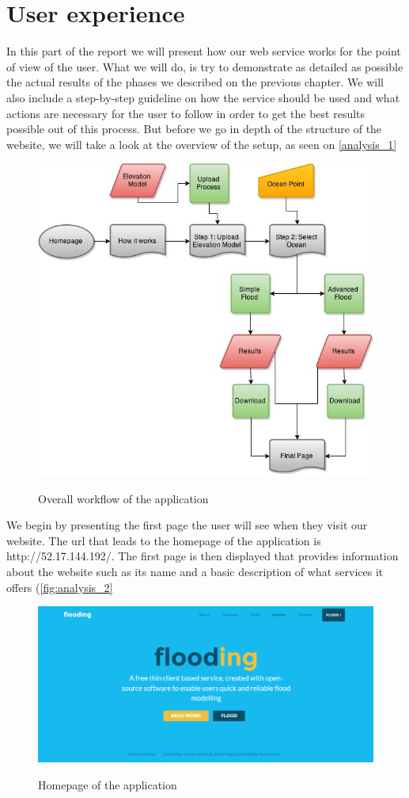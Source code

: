 \section{User experience}
In this part of the report we will present  how our web service works for the point of view of the user. What we will do, is try to demonstrate as detailed as possible the actual results of the phases we described on the previous chapter. We will also include a step-by-step guideline on how the service should be used and what actions are necessary for the user to follow in order to get the best results possible out of this process. But before we go in depth of the structure of the website, we will take a look at the overview of the setup, as seen on \autoref{analysis_1}

\begin{figure}[h!]
\centering
	{\includegraphics[width=0.75\linewidth]{gfx/Analysis_Website/1.jpg}}
\caption{Overall workflow of the application}
\label{fig:analysis_1}
\end{figure}

We begin by presenting the first page the user will see when they visit our website. The url that leads to the homepage of the application is http://52.17.144.192/. The first page is then displayed that provides information about the website such as its name and a basic description of what services it offers (\autoref{fig:analysis_2}

\begin{figure}[h!]
\centering
	{\includegraphics[width=0.75\linewidth]{gfx/Analysis_Website/2.png}}
\caption{Homepage of the application}
\label{fig:analysis_2}
\end{figure}

